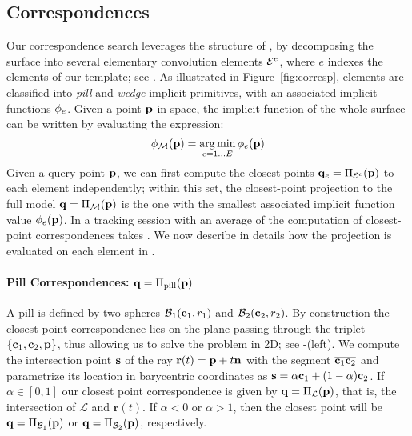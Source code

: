 \label{sec:model} %

\subsection{Correspondences}
\label{sec:corresp}
Our correspondence search leverages the structure of , by decomposing the surface into several elementary convolution elements $\mathcal{E}^e$, where $e$ indexes the  elements of our template; see . As illustrated in Figure~\ref{fig:corresp}, elements are classified into 
\emph{pill} and \emph{wedge} implicit primitives, with an associated implicit functions $\phi_e$.
Given a point $\mathbf{p}$ in space, the implicit function of the whole surface can be written by evaluating the expression:
\begin{equation}
\phi_{\mathcal{M}}(\mathbf{p}) = \operatorname*{arg\,min}_{e=1 \dots E} \phi_e(\mathbf{p})
\label{eq:piecewise}
\end{equation}
%
Given a query point $\mathbf{p}$, we can first compute the closest-points $\mathbf{q}_e = \Pi_{\mathcal{E}^e}(\mathbf{p})$ to each element independently; within this set, the closest-point projection to the full model $\mathbf{q} = \Pi_{\mathcal{M}}(\mathbf{p})$ is the one with the smallest associated implicit function value $\phi_e(\mathbf{p})$. In a tracking session with an average of  the computation of closest-point correspondences takes . We now describe in details how the projection is evaluated on each element in . 

\paragraph{Pill Correspondences: $\mathbf{q}=\Pi_\text{pill}(\mathbf{p})$}
A pill is defined by two spheres $\mathcal{B}_1(\mathbf{c}_1,r_1)$ and $\mathcal{B}_2(\mathbf{c}_2,r_2)$. By construction the closest point correspondence lies on the plane passing through the triplet $\{ \mathbf{c}_1, \mathbf{c}_2, \mathbf{p} \}$, thus allowing us to solve the problem in 2D; see -(left). 
% 
We compute the intersection point $\mathbf{s}$ of the ray $\mathbf{r}(t) = \mathbf{p} + t\mathbf{n}$ with the segment $\overline{\mathbf{c}_1 \mathbf{c}_2}$ and parametrize its location in barycentric coordinates as $\mathbf{s} = \alpha\mathbf{c}_1 + (1-\alpha)\mathbf{c}_2$. If $\alpha \in [0,1]$ our closest point correspondence is given by $\mathbf{q}=\Pi_\mathcal{L}(\mathbf{p})$, that is, the intersection of $\mathcal{L}$ and $\mathbf{r}(t)$.  If $\alpha<0$ or $\alpha>1$, then the closest point will be $\mathbf{q}=\Pi_{\mathcal{B}_1}(\mathbf{p})$ or $\mathbf{q}=\Pi_{\mathcal{B}_2}(\mathbf{p})$, respectively. 

